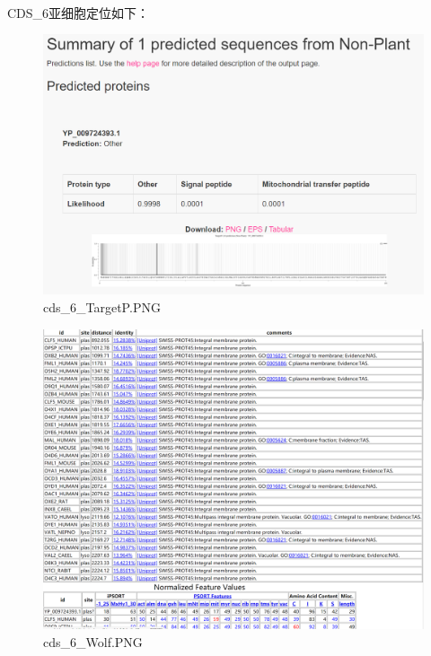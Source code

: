\documentclass[supercite]{HustGraduPaper}
\begin{document}
	\paragraph{}\label{subpara:subpara}CDS\_6亚细胞定位如下：
	\begin{figure}[H]
		\centering
		\includegraphics[width=1\textwidth]{./material/practice2/cds_6/TargetP.png}
		\caption{cds\_6\_TargetP.PNG}
	\end{figure}
	\begin{figure}[H]
		\centering
		\includegraphics[width=1\textwidth]{./material/practice2/cds_6/wolf.png}
		\caption{cds\_6\_Wolf.PNG}
	\end{figure}
\end{document}
